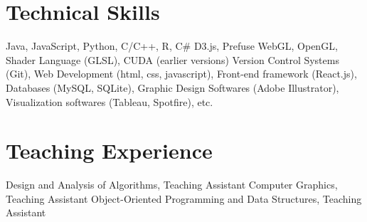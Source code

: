 \documentclass[10pt,a4paper,sans]{moderncv} %
\begin{document}
\section{Technical Skills}

 {Java, JavaScript, Python, C/C++, R, C\#}
 {D3.js, Prefuse}
 {WebGL, OpenGL, Shader Language (GLSL), CUDA (earlier versions)}
 {Version Control Systems (Git), Web Development (html, css, javascript), Front-end framework (React.js), Databases (MySQL, SQLite), Graphic Design Softwares (Adobe Illustrator), Visualization softwares (Tableau, Spotfire), etc.}



\section{Teaching Experience}

 {Design and Analysis of Algorithms, Teaching Assistant}
 {Computer Graphics, Teaching Assistant}
 {Object-Oriented Programming and Data Structures, Teaching Assistant}











\end{document}
